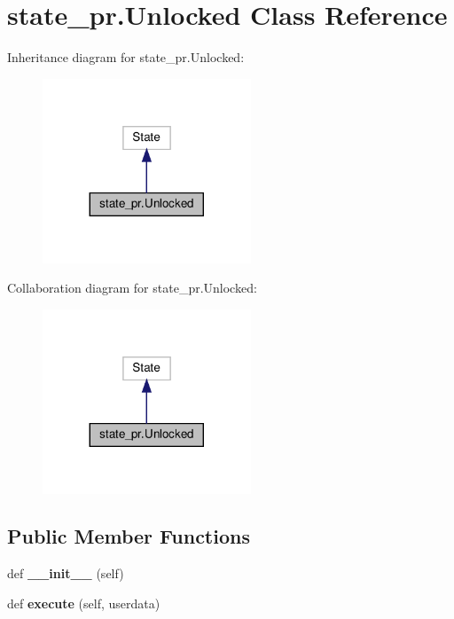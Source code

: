 \hypertarget{classstate__pr_1_1Unlocked}{}\section{state\+\_\+pr.\+Unlocked Class Reference}
\label{classstate__pr_1_1Unlocked}


Inheritance diagram for state\+\_\+pr.\+Unlocked\+:
\nopagebreak
\begin{figure}[H]
\begin{center}
\leavevmode
\includegraphics[width=176pt]{classstate__pr_1_1Unlocked__inherit__graph}
\end{center}
\end{figure}


Collaboration diagram for state\+\_\+pr.\+Unlocked\+:
\nopagebreak
\begin{figure}[H]
\begin{center}
\leavevmode
\includegraphics[width=176pt]{classstate__pr_1_1Unlocked__coll__graph}
\end{center}
\end{figure}
\subsection*{Public Member Functions}
\begin{DoxyCompactItemize}
\item 
\mbox{\label{classstate__pr_1_1Unlocked_a99fea568754486c1c5f5834214ab2fe2}} 
def {\bfseries \+\_\+\+\_\+init\+\_\+\+\_\+} (self)
\item 
\mbox{\label{classstate__pr_1_1Unlocked_a8c2c76d4b7cc1f1b0f5d07ac15bb3089}} 
def {\bfseries execute} (self, userdata)
\end{DoxyCompactItemize}


